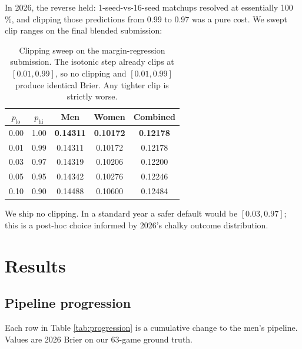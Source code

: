 \documentclass[11pt, a4paper]{article}
\begin{document}
In 2026, the reverse held: 1-seed-vs-16-seed matchups resolved at essentially 100\,\%, and clipping those predictions from 0.99 to 0.97 was a pure cost. We swept clip ranges on the final blended submission:

\begin{table}[H]
\centering
\begin{tabular}{@{}cccc|c@{}}
\toprule
$p_{\text{lo}}$ & $p_{\text{hi}}$ & \textbf{Men} & \textbf{Women} & \textbf{Combined} \\
\midrule
0.00 & 1.00 & \textbf{0.14311} & \textbf{0.10172} & \textbf{0.12178} \\
0.01 & 0.99 & 0.14311 & 0.10172 & 0.12178 \\
0.03 & 0.97 & 0.14319 & 0.10206 & 0.12200 \\
0.05 & 0.95 & 0.14342 & 0.10276 & 0.12246 \\
0.10 & 0.90 & 0.14488 & 0.10600 & 0.12484 \\
\bottomrule
\end{tabular}
\caption{Clipping sweep on the margin-regression submission. The isotonic step already clips at $[0.01, 0.99]$, so no clipping and $[0.01, 0.99]$ produce identical Brier. Any tighter clip is strictly worse.}
\end{table}

We ship no clipping. In a standard year a safer default would be $[0.03, 0.97]$; this is a post-hoc choice informed by 2026's chalky outcome distribution.

\section{Results}
\label{sec:results}

\subsection{Pipeline progression}

Each row in Table \ref{tab:progression} is a cumulative change to the men's pipeline. Values are 2026 Brier on our 63-game ground truth.
\end{document}
